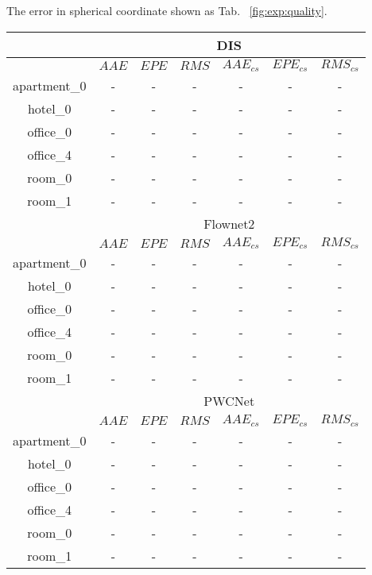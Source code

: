 The error in spherical coordinate shown as Tab. ~\ref{fig:exp:quality}.



\begin{table}[h!]
	\centering
	\begin{tabular}{ c | c | c | c | c | c | c }
		\hline
		& \multicolumn{6}{c}{DIS}  \\
		\hline
		& ${AAE}$ & ${EPE}$ & ${RMS}$ & ${AAE_{cs}}$ & ${EPE_{cs}}$ & ${RMS_{cs}}$ \\
		\hline
		apartment\_0 & - & - & -  & - & - & -  \\ 
		\hline
		hotel\_0 & - & - & -  & - & - & -  \\ 
		\hline
		office\_0 & - & - & - & - & - & -  \\ 
		\hline
		office\_4 & - & - & -  & - & - & -  \\ 
		\hline
		room\_0 & - & - & - & - & - & -  \\ 
		\hline
		room\_1 & - & - & -  & - & - & -  \\ 
		\hline\hline
		& \multicolumn{6}{c}{Flownet2} \\
		\hline
		& ${AAE}$ & ${EPE}$ & ${RMS}$ & ${AAE_{cs}}$ & ${EPE_{cs}}$ & ${RMS_{cs}}$ \\
		\hline
		apartment\_0 & - & - & -  & - & - & -  \\ 
		\hline
		hotel\_0 & - & - & -  & - & - & -  \\ 
		\hline
		office\_0 & - & - & - & - & - & -  \\ 
		\hline
		office\_4 & - & - & -  & - & - & -  \\ 
		\hline
		room\_0 & - & - & - & - & - & -  \\ 
		\hline
		room\_1 & - & - & -  & - & - & -  \\ 
		\hline\hline
		& \multicolumn{6}{c}{PWCNet} \\
		\hline
		& ${AAE}$ & ${EPE}$ & ${RMS}$ & ${AAE_{cs}}$ & ${EPE_{cs}}$ & ${RMS_{cs}}$ \\
		\hline
		apartment\_0 & - & - & -  & - & - & -  \\ 
		\hline
		hotel\_0 & - & - & -  & - & - & -  \\ 
		\hline
		office\_0 & - & - & - & - & - & -  \\ 
		\hline
		office\_4 & - & - & -  & - & - & -  \\ 
		\hline
		room\_0 & - & - & - & - & - & -  \\ 
		\hline
		room\_1 & - & - & -  & - & - & -  \\ 
		\hline\hline

\end{tabular}
\end{table}
